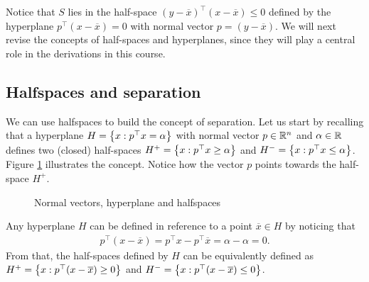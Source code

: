 Notice that $S$ lies in the half-space $(y-\overline{x})^\top(x - \overline{x}) \leq 0$ defined by the hyperplane $p^\top(x - \overline{x}) =0$ with normal vector $p = (y - \overline{x})$. We will next revise the concepts of half-spaces and hyperplanes, since they will play a central role in the derivations in this course.  

\subsection{Halfspaces and separation}

We can use halfspaces to build the concept of separation. Let us start by recalling that a hyperplane $H = \left\{ x : p^\top x = \alpha \right \}$ with normal vector $p \in \mathbb{R}^n$ and $\alpha \in \mathbb{R}$ defines two (closed) half-spaces $H^+ = \left\{ x : p^\top x \geq \alpha \right \}$ and $H^- = \left\{ x : p^\top x \leq \alpha \right \}$. Figure \ref{fig:hyperplane} illustrates the concept. Notice how the vector $p$ points towards the half-space $H^+$.
%
\begin{figure}
	\caption{Normal vectors, hyperplane and halfspaces} \label{fig:hyperplane}
\end{figure}
 
Any hyperplane $H$ can be defined in reference to a point $\overline{x} \in H$ by noticing that 
%
\begin{align*}
	p^\top(x - \overline{x}) = p^\top x - p^\top \overline{x} = \alpha - \alpha = 0.  
\end{align*}
%
From that, the half-spaces defined by $H$ can be equivalently defined as $H^+ = \left\{ x : p^\top (x - \overline{x}) \geq 0 \right \}$ and $H^- = \left\{ x : p^\top (x - \overline{x}) \leq 0 \right \}$.

